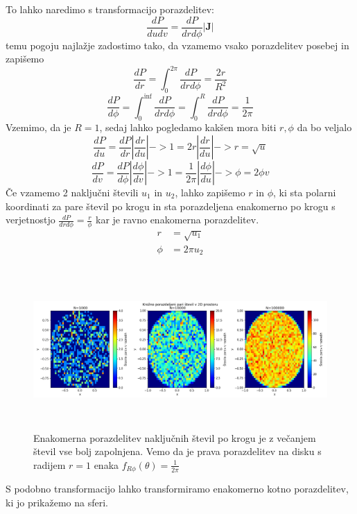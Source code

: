 \documentclass[11pt, a4paper]{article}
\renewcommand{\vec}[1]{\mathbf{#1}}
\begin{document}
To lahko naredimo s transformacijo porazdelitev:
\begin{equation}
\frac{dP}{dudv} = \frac{dP}{dr d\phi} |\vec{J}|
\end{equation}
temu pogoju najlažje zadostimo tako, da vzamemo vsako porazdelitev posebej in zapišemo
\begin{equation}
\frac{dP}{dr} = \int_0^{2\pi} \frac{dP}{dr d\phi} =  \frac{2r}{R^2} 
\end{equation}
\begin{equation}
\frac{dP}{d \phi} = \int_0^{\inf} \frac{dP}{dr d\phi} = \int_0^{R} \frac{dP}{dr d\phi} = \frac{1}{2 \pi} 
\end{equation}
Vzemimo, da je $R=1$, sedaj lahko pogledamo kakšen mora biti $r,\phi$ da bo veljalo
\begin{equation}
\frac{dP}{du} = \frac{dP}{d r}  |\frac{dr}{du}| -> 1 = 2r |\frac{dr}{du}| -> r = \sqrt{u}
\end{equation}
\begin{equation}
\frac{dP}{d v} = \frac{dP}{d \phi }  |\frac{d \phi}{dv}| -> 1 = \frac{1}{2 \pi}|\frac{d \phi}{du}| -> \phi = 2 \phi v
\end{equation}
Če vzamemo 2 naključni števili $u_1$ in $u_2$, lahko zapišemo $r$ in $\phi$, ki sta polarni koordinati za pare števil po krogu in sta porazdeljena enakomerno po krogu s verjetnostjo  $\frac{dP}{dr d\phi} = \frac{r}{\phi}$ kar je ravno enakomerna porazdelitev.
\begin{equation}
\begin{split}
r &= \sqrt{u_1} \\
\phi &= 2 \pi u_2 \\
\end{split}
\end{equation}

\begin{figure}[H]
\hspace*{-2.5cm}  
  \includegraphics[width=21cm,height=6cm]{druga_1_krozno.png}
 \caption{Enakomerna porazdelitev naključnih števil po krogu je z večanjem števil vse bolj zapolnjena. Vemo da je prava porazdelitev na disku s radijem $r = 1$ enaka $f_{R \phi}(\theta)=\frac{1}{2\pi}$}
\end{figure}
S podobno transformacijo lahko transformiramo enakomerno kotno porazdelitev, ki jo prikažemo na sferi. 
\end{document}
